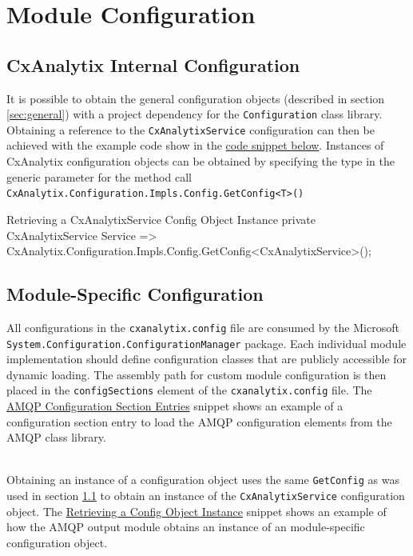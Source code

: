 \section{Module Configuration}

\subsection{CxAnalytix Internal Configuration}\label{sec:internal_config}

It is possible to obtain the general configuration objects (described in section \ref{sec:general}) with a project dependency for the \texttt{Configuration}
class library.  Obtaining a reference to the \texttt{CxAnalytixService} configuration can then be achieved with the example code show in the 
\hyperref[lst:global_config]{code snippet below}.  Instances of CxAnalytix configuration objects can be obtained by specifying the type in the generic parameter for the 
method call \texttt{CxAnalytix.Configuration.Impls.Config.GetConfig<T>()} 


\begin{code}{Retrieving a CxAnalytixService Config Object Instance}{\label{lst:global_config}}{}
private CxAnalytixService Service => 
    CxAnalytix.Configuration.Impls.Config.GetConfig<CxAnalytixService>();
\end{code}


\subsection{Module-Specific Configuration}

All configurations in the \texttt{cxanalytix.config} file are consumed by the Microsoft\\ 
\texttt{System.Configuration.ConfigurationManager} package.
Each individual module implementation should define configuration classes that are publicly accessible for dynamic loading.
The assembly path for custom module configuration is then placed in the \texttt{configSections} element of the \texttt{cxanalytix.config}
file.  The \hyperref[lst:config_sections]{AMQP Configuration Section Entries} snippet shows an example of a configuration section entry to load the AMQP configuration elements
from the AMQP class library.

\noindent\\Obtaining an instance of a configuration object uses the same \texttt{GetConfig} as was used in section \ref{sec:internal_config}
to obtain an instance of the \texttt{CxAnalytixService} configuration object.  The \hyperref[lst:amqp_config]{Retrieving a Config Object Instance} snippet 
shows an example of how the AMQP output module obtains an instance of an module-specific configuration object.\\

